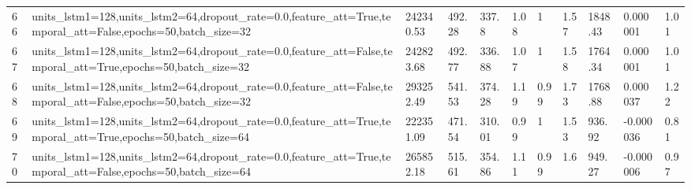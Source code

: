 \begin{longtable}{C{0.8cm} L{2cm} C{1.15cm} C{1.15cm} C{1.15cm} C{1.15cm} C{0.85cm} C{1.25cm} C{1.2cm} C{1.5cm} C{1.0cm}}
66 & units\_lstm1=128,\newline units\_lstm2=64,\newline dropout\_rate=0.0,\newline feature\_att=True,\newline temporal\_att=False,\newline epochs=50,\newline batch\_size=32 & 242340.53 & 492.28 & 337.8 & 1.08 & 1 & 1.57 & 1848.43 & 0.000001 & 1.01 \\
67 & units\_lstm1=128,\newline units\_lstm2=64,\newline dropout\_rate=0.0,\newline feature\_att=False,\newline temporal\_att=True,\newline epochs=50,\newline batch\_size=32 & 242823.68 & 492.77 & 336.88 & 1.07 & 1 & 1.58 & 1764.34 & 0.000001 & 1.01 \\
68 & units\_lstm1=128,\newline units\_lstm2=64,\newline dropout\_rate=0.0,\newline feature\_att=False,\newline temporal\_att=False,\newline epochs=50,\newline batch\_size=32 & 293252.49 & 541.53 & 374.28 & 1.19 & 0.99 & 1.73 & 1768.88 & 0.000037 & 1.22 \\
69 & units\_lstm1=128,\newline units\_lstm2=64,\newline dropout\_rate=0.0,\newline feature\_att=True,\newline temporal\_att=True,\newline epochs=50,\newline batch\_size=64 & 222351.09 & 471.54 & 310.01 & 0.99 & 1 & 1.53 & 936.92 & -0.000036 & 0.81 \\
70 & units\_lstm1=128,\newline units\_lstm2=64,\newline dropout\_rate=0.0,\newline feature\_att=True,\newline temporal\_att=False,\newline epochs=50,\newline batch\_size=64 & 265852.18 & 515.61 & 354.86 & 1.11 & 0.99 & 1.6 & 949.27 & -0.000006 & 0.97 \\

\end{longtable}
